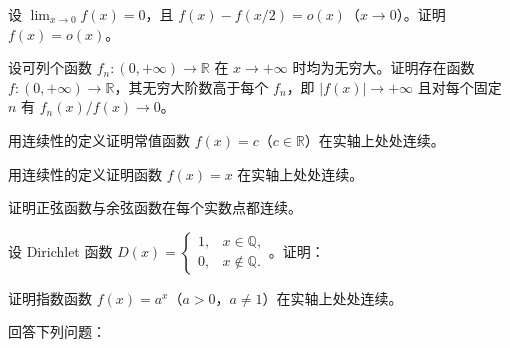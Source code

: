 \noindent\begin{minipage}{\textwidth}
设 $\lim_{x\to0}f(x)=0$，且 $f(x)-f(x/2)=o(x)$（$x\to0$）。证明 $f(x)=o(x)$。
\end{minipage}\par\vfill
\noindent\begin{minipage}{\textwidth}
设可列个函数 $f_n:(0,+\infty)\to\mathbb R$ 在 $x\to+\infty$ 时均为无穷大。证明存在函数 $f:(0,+\infty)\to\mathbb R$，其无穷大阶数高于每个 $f_n$，即 $|f(x)|\to+\infty$ 且对每个固定 $n$ 有 $f_n(x)/f(x)\to0$。
\end{minipage}\par\vfill
\newpage
\noindent\begin{minipage}{\textwidth}
用连续性的定义证明常值函数 $f(x)=c$（$c\in\mathbb R$）在实轴上处处连续。
\end{minipage}\par\vfill
\noindent\begin{minipage}{\textwidth}
用连续性的定义证明函数 $f(x)=x$ 在实轴上处处连续。
\end{minipage}\par\vfill
\noindent\begin{minipage}{\textwidth}
证明正弦函数与余弦函数在每个实数点都连续。
\end{minipage}\par\vfill
\newpage
\noindent\begin{minipage}{\textwidth}
设 Dirichlet 函数 $D(x)=\begin{cases}1,&x\in\mathbb Q,\\0,&x\notin\mathbb Q.\end{cases}$。证明：
\end{minipage}\par\vfill
\noindent\begin{minipage}{\textwidth}
证明指数函数 $f(x)=a^x$（$a>0$，$a\ne1$）在实轴上处处连续。
\end{minipage}\par\vfill
\noindent\begin{minipage}{\textwidth}
回答下列问题：
\end{minipage}\par\vfill
